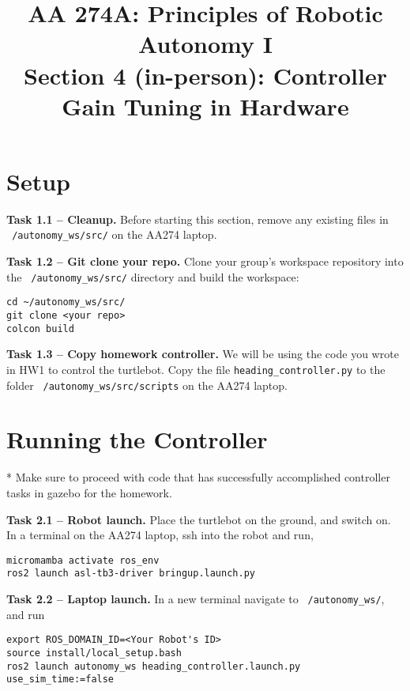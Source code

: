 \documentclass{article}
\title{AA 274A: Principles of Robotic Autonomy I \\Section 4 (in-person): Controller Gain Tuning in Hardware}
\date{}
\begin{document}
\maketitle
\pagestyle{fancy}
\vspace{-1.25cm}
\section{Setup}
{\bf Task 1.1 -- Cleanup.} Before starting this section, remove any existing files in \texttt{~/autonomy\_ws/src/} on the AA274 laptop.

{\bf Task 1.2 -- Git clone your repo.} Clone your group's workspace repository into the \texttt{~/autonomy\_ws/src/} directory and build the workspace:
\begin{lstlisting}
cd ~/autonomy_ws/src/
git clone <your repo>
colcon build
\end{lstlisting}

{\bf Task 1.3 -- Copy homework controller.} We will be using the code you wrote in HW1 to control the turtlebot. Copy the file {\color{blue} \texttt{heading\_controller.py}} to the folder \texttt{~/autonomy\_ws/src/scripts} on the AA274 laptop. 

\section{Running the Controller}
* Make sure to proceed with code that has successfully accomplished controller tasks in gazebo for the homework. 

{\bf Task 2.1 -- Robot launch.} Place the turtlebot on the ground, and switch on. In a terminal on the AA274 laptop, ssh into the robot and run,
\begin{lstlisting}
micromamba activate ros_env
ros2 launch asl-tb3-driver bringup.launch.py
\end{lstlisting}

{\bf Task 2.2 -- Laptop launch.}  In a new terminal navigate to \texttt{~/autonomy\_ws/}, and run
\begin{lstlisting}
export ROS_DOMAIN_ID=<Your Robot's ID>
source install/local_setup.bash
ros2 launch autonomy_ws heading_controller.launch.py use_sim_time:=false
\end{lstlisting}
\end{document}
